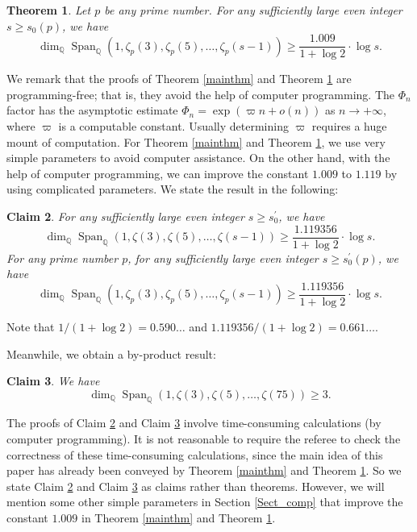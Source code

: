 \documentclass[12pt]{article}
\newtheorem{theorem}{Theorem}[section]
\newtheorem{claim}[theorem]{Claim}
\numberwithin{equation}{section}
\begin{document}
\begin{theorem}\label{mainthm_p}
Let $p$ be any prime number. For any sufficiently large even integer $s \geqslant s_0(p)$, we have
\[ \dim_\mathbb{Q}\operatorname{Span}_{\mathbb{Q}}\left( 1,\zeta_p(3),\zeta_p(5),\ldots,\zeta_p(s-1) \right) \geqslant \frac{1.009}{1+\log 2}\cdot \log s.\]
\end{theorem}

We remark that the proofs of Theorem \ref{mainthm} and Theorem \ref{mainthm_p} are programming-free; that is, they avoid the help of computer programming. The $\Phi_n$ factor has the asymptotic estimate $\Phi_n = \exp(\varpi n + o(n))$ as $n \to +\infty$, where $\varpi$ is a computable constant. Usually determining $\varpi$ requires a huge mount of computation. For Theorem \ref{mainthm} and Theorem \ref{mainthm_p}, we use very simple parameters to avoid computer assistance. On the other hand, with the help of computer programming, we can improve the constant $1.009$ to $1.119$ by using complicated parameters. We state the result in the following:

\begin{claim}\label{main_claim}
For any sufficiently large even integer $s \geqslant s_0^{\prime}$, we have
\[ \dim_\mathbb{Q}\operatorname{Span}_{\mathbb{Q}}\left( 1,\zeta(3),\zeta(5),\ldots,\zeta(s-1) \right) \geqslant \frac{1.119356}{1+\log 2}\cdot \log s.\]
For any prime number $p$, for any sufficiently large even integer $s \geqslant s_0^{\prime}(p)$, we have
\[ \dim_\mathbb{Q}\operatorname{Span}_{\mathbb{Q}}\left( 1,\zeta_p(3),\zeta_p(5),\ldots,\zeta_p(s-1) \right) \geqslant \frac{1.119356}{1+\log 2}\cdot \log s.\]
\end{claim}
Note that $1/(1+\log 2) = 0.590\ldots$ and $1.119356/(1+\log 2) = 0.661\ldots$. 

Meanwhile, we obtain a by-product result:
\begin{claim}\label{thm75}
We have
\[ \dim_\mathbb{Q}\operatorname{Span}_{\mathbb{Q}}\left( 1,\zeta(3),\zeta(5),\ldots,\zeta(75) \right) \geqslant 3. \]
\end{claim}

The proofs of Claim \ref{main_claim} and Claim \ref{thm75} involve time-consuming calculations (by computer programming). It is not reasonable to require the referee to check the correctness of these time-consuming calculations, since the main idea of this paper has already been conveyed by Theorem \ref{mainthm} and Theorem \ref{mainthm_p}. So we state Claim \ref{main_claim} and Claim \ref{thm75} as claims rather than theorems. However, we will mention some other simple parameters in Section \ref{Sect_comp} that improve the constant $1.009$ in Theorem \ref{mainthm} and Theorem \ref{mainthm_p}. 
\end{document}
